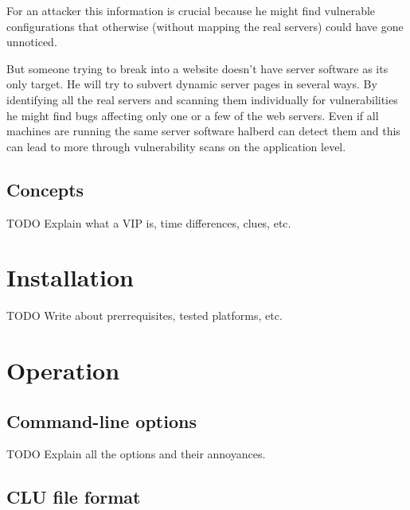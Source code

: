 \documentclass[a4paper]{book}
\begin{document}
For an attacker this information is crucial because he might find vulnerable
configurations that otherwise (without mapping the real servers) could have
gone unnoticed.

But someone trying to break into a website doesn't have server software as its
only target. He will try to subvert dynamic server pages in several ways.  By
identifying all the real servers and scanning them individually for
vulnerabilities he might find bugs affecting only one or a few of the web
servers. Even if all machines are running the same server software halberd can
detect them and this can lead to more through vulnerability scans on the
application level.

\section{Concepts}

TODO Explain what a VIP is, time differences, clues, etc.

\chapter{Installation}

TODO Write about prerrequisites, tested platforms, etc.

\chapter{Operation}

\section{Command-line options}

TODO Explain all the options and their annoyances.

\section{CLU file format}
\end{document}
